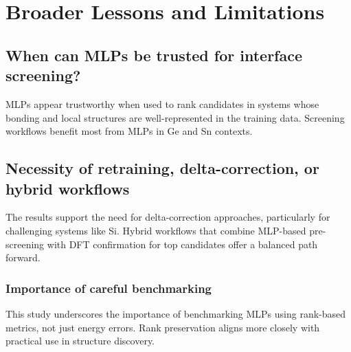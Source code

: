 \section{Broader Lessons and Limitations} \label{section:broader_lessons_and_limitations}

\subsection{When can MLPs be trusted for interface screening?}

MLPs appear trustworthy when used to rank candidates in systems whose bonding and local structures are well-represented in the training data. Screening workflows benefit most from MLPs in Ge and Sn contexts.

\subsection{Necessity of retraining, delta-correction, or hybrid workflows}

The results support the need for delta-correction approaches, particularly for challenging systems like Si. Hybrid workflows that combine MLP-based pre-screening with DFT confirmation for top candidates offer a balanced path forward.


\subsubsection{Importance of careful benchmarking}

This study underscores the importance of benchmarking MLPs using rank-based metrics, not just energy errors. Rank preservation aligns more closely with practical use in structure discovery.